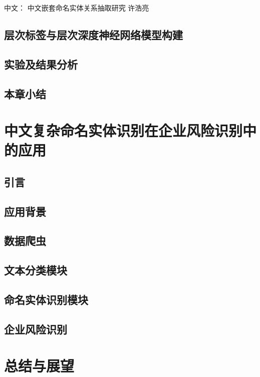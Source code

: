 \documentclass[winfonts,master,oneside,nobackinfo]{njuthesis}
\begin{document}
中文：
中文嵌套命名实体关系抽取研究 许浩亮



\section{层次标签与层次深度神经网络模型构建}

\section{实验及结果分析}

\section{本章小结}

\chapter{中文复杂命名实体识别在企业风险识别中的应用}

\section{引言}

\section{应用背景}

\section{数据爬虫}

\section{文本分类模块}

\section{命名实体识别模块}

\section{企业风险识别}

\chapter{总结与展望}
\end{document}
